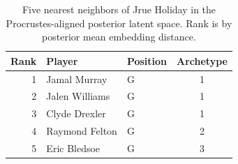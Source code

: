 \begin{table}[htbp]
  \centering\small
  \begin{tabular}{rllc}
    \toprule
    Rank & Player & Position & Archetype \\
    \midrule
    1 & Jamal Murray & G & 1 \\
    2 & Jalen Williams & G & 1 \\
    3 & Clyde Drexler & G & 1 \\
    4 & Raymond Felton & G & 2 \\
    5 & Eric Bledsoe & G & 3 \\
    \bottomrule
  \end{tabular}
  \caption{Five nearest neighbors of Jrue Holiday in the Procrustes-aligned posterior latent space. Rank is by posterior mean embedding distance.}
  \label{tab:Jrue_Holiday_neighbors}
\end{table}

